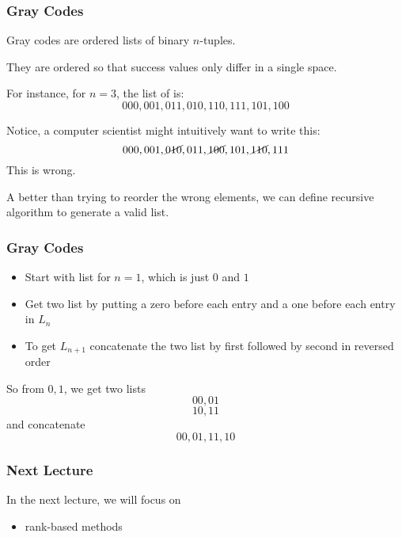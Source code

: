 \documentclass[10pt]{beamer}
\begin{document}
\begin{frame}
\frametitle{Gray Codes}

Gray codes are ordered lists of binary $n$-tuples. \newline

They are ordered so that success values only differ in a single space.

For instance, for $n = 3$, the list of is:
\[ 000, 001, 011, 010, 110, 111, 101, 100 \]

Notice, a computer scientist might intuitively want to write this:
\[ 000, 001, \cancel{010}, 011, \cancel{100}, 101, \cancel{110}, 111 \]
This is wrong. \newline

A better than trying to reorder the wrong elements, we can define recursive algorithm to generate a valid list.

\end{frame}

\begin{frame}
\frametitle{Gray Codes}

\begin{itemize}
\item Start with list for $n = 1$, which is just $0$ and $1$ 
\item Get two list by putting a zero before each entry and a one before each entry in $L_n$ 
\item To get $L_{n+1}$ concatenate the two list by first followed by second in reversed order 
\end{itemize}

\vspace{0.3cm}
So from $0,1$, we get two lists
\[ 00, 01 \]
\[ 10, 11 \]
and concatenate
\[  00, 01, 11, 10 \]

\end{frame}

\begin{frame}
\frametitle{Next Lecture}

In the next lecture, we will focus on
\begin{itemize}
\item rank-based methods
\end{itemize}

\end{frame}
\end{document}

